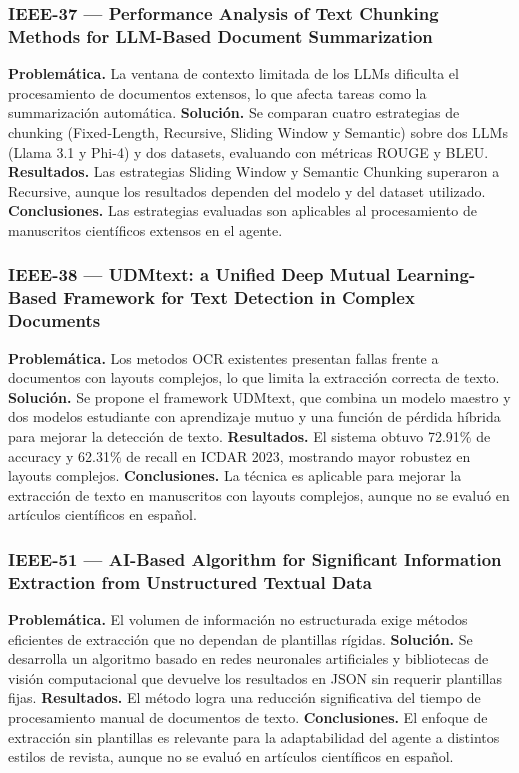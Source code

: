 \subsubsection*{IEEE-37 --- Performance Analysis of Text Chunking Methods for LLM-Based Document Summarization \cite{ref11}}

\textbf{Problemática.} La ventana de contexto limitada de los LLMs dificulta el procesamiento de documentos extensos, lo que afecta tareas como la summarización automática. \textbf{Solución.} Se comparan cuatro estrategias de chunking (Fixed-Length, Recursive, Sliding Window y Semantic) sobre dos LLMs (Llama 3.1 y Phi-4) y dos datasets, evaluando con métricas ROUGE y BLEU. \textbf{Resultados.} Las estrategias Sliding Window y Semantic Chunking superaron a Recursive, aunque los resultados dependen del modelo y del dataset utilizado. \textbf{Conclusiones.} Las estrategias evaluadas son aplicables al procesamiento de manuscritos científicos extensos en el agente.

\subsubsection*{IEEE-38 --- UDMtext: a Unified Deep Mutual Learning-Based Framework for Text Detection in Complex Documents \cite{ref12}}

\textbf{Problemática.} Los metodos OCR existentes presentan fallas frente a documentos con layouts complejos, lo que limita la extracción correcta de texto. \textbf{Solución.} Se propone el framework UDMtext, que combina un modelo maestro y dos modelos estudiante con aprendizaje mutuo y una función de pérdida híbrida para mejorar la detección de texto. \textbf{Resultados.} El sistema obtuvo 72.91\% de accuracy y 62.31\% de recall en ICDAR 2023, mostrando mayor robustez en layouts complejos. \textbf{Conclusiones.} La técnica es aplicable para mejorar la extracción de texto en manuscritos con layouts complejos, aunque no se evaluó en artículos científicos en español.

\subsubsection*{IEEE-51 --- AI-Based Algorithm for Significant Information Extraction from Unstructured Textual Data \cite{ref13}}

\textbf{Problemática.} El volumen de información no estructurada exige métodos eficientes de extracción que no dependan de plantillas rígidas. \textbf{Solución.} Se desarrolla un algoritmo basado en redes neuronales artificiales y bibliotecas de visión computacional que devuelve los resultados en JSON sin requerir plantillas fijas. \textbf{Resultados.} El método logra una reducción significativa del tiempo de procesamiento manual de documentos de texto. \textbf{Conclusiones.} El enfoque de extracción sin plantillas es relevante para la adaptabilidad del agente a distintos estilos de revista, aunque no se evaluó en artículos científicos en español.

